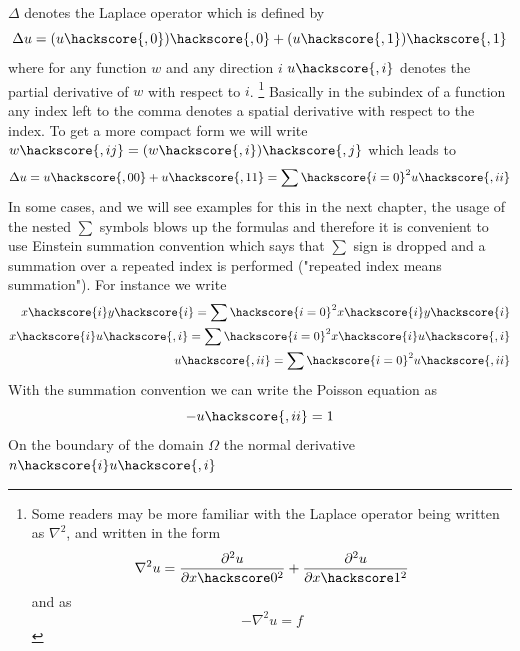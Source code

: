 $\Delta$ denotes the Laplace operator which is defined by
\begin{equation}
\Delta u = (u\hackscore {,0})\hackscore{,0}+(u\hackscore{,1})\hackscore{,1}
\label{eq:FirstSteps.1.1}
\end{equation}
where for any function $w$ and any direction $i$ $u\hackscore{,i}$
denotes the partial derivative  of $w$ with respect to $i$.  
\footnote{Some readers
may be more familiar with the Laplace operator being written
as $\nabla^2$, and written in the form
\begin{equation*}
\nabla^2 u = \frac{\partial^2 u}{\partial x\hackscore 0^2} 
+ \frac{\partial^2 u}{\partial  x\hackscore 1^2}
\end{equation*}
and  as
\begin{equation*}
-\nabla^2 u = f
\end{equation*}
}
Basically in the subindex of a function any index left to the comma denotes a spatial derivative with respect 
to the index. To get a more compact form we will write $w\hackscore{,ij}=(w\hackscore {,i})\hackscore{,j}$
which leads to
\begin{equation}
\Delta u = u\hackscore{,00}+u\hackscore{,11}=\sum\hackscore{i=0}^2 u\hackscore{,ii}
\label{eq:FirstSteps.1.1b}
\end{equation}
In some cases, and we will see examples for this in the next chapter,
the usage of the nested $\sum$ symbols blows up the formulas and therefore
it is convenient to use Einstein summation convention  which 
says that $\sum$ sign is dropped and a summation over a repeated index is performed 
("repeated index means summation"). For instance we write
\begin{eqnarray}
x\hackscore{i}y\hackscore{i}=\sum\hackscore{i=0}^2 x\hackscore{i}y\hackscore{i}   \\
x\hackscore{i}u\hackscore{,i}=\sum\hackscore{i=0}^2 x\hackscore{i}u\hackscore{,i}   \\
u\hackscore{,ii}=\sum\hackscore{i=0}^2 u\hackscore{,ii} \\
\label{eq:FirstSteps.1.1c}
\end{eqnarray}
With the summation convention we can write the Poisson equation  as
\begin{equation}
- u\hackscore{,ii} =1 
\label{eq:FirstSteps.1.sum}
\end{equation}
On the boundary of the domain $\Omega$ the normal derivative $n\hackscore{i} u\hackscore{,i}$
